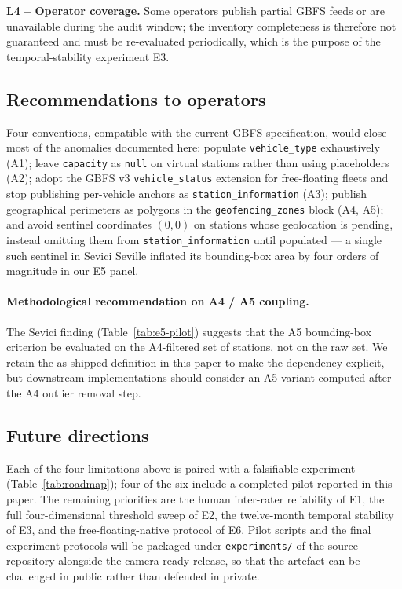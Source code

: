 \documentclass[11pt,a4paper]{article}
\begin{document}
\textbf{L4 -- Operator coverage.} Some operators publish partial GBFS
feeds or are unavailable during the audit window; the inventory
completeness is therefore not guaranteed and must be re-evaluated
periodically, which is the purpose of the temporal-stability
experiment E3.

\subsection{Recommendations to operators}
Four conventions, compatible with the current GBFS specification,
would close most of the anomalies documented here: populate
\texttt{vehicle\_type} exhaustively (A1); leave \texttt{capacity}
as \texttt{null} on virtual stations rather than using placeholders
(A2); adopt the GBFS v3 \texttt{vehicle\_status} extension for
free-floating fleets and stop publishing per-vehicle anchors as
\texttt{station\_information} (A3); publish geographical perimeters
as polygons in the \texttt{geofencing\_zones} block (A4, A5); and
avoid sentinel coordinates $(0,0)$ on stations whose geolocation is
pending, instead omitting them from \texttt{station\_information}
until populated --- a single such sentinel in Sevici Seville
inflated its bounding-box area by four orders of magnitude in our
E5 panel.

\paragraph{Methodological recommendation on A4 / A5 coupling.}
The Sevici finding (Table~\ref{tab:e5-pilot}) suggests that the A5
bounding-box criterion be evaluated on the A4-filtered set of
stations, not on the raw set. We retain the as-shipped definition
in this paper to make the dependency explicit, but downstream
implementations should consider an A5 variant computed after the
A4 outlier removal step.

\subsection{Future directions}
Each of the four limitations above is paired with a falsifiable
experiment (Table~\ref{tab:roadmap}); four of the six include a
completed pilot reported in this paper. The remaining priorities are
the human inter-rater reliability of E1, the full four-dimensional
threshold sweep of E2, the twelve-month temporal stability of E3,
and the free-floating-native protocol of E6. Pilot scripts and the
final experiment protocols will be packaged under
\texttt{experiments/} of the source repository alongside the
camera-ready release, so that the artefact can be challenged in
public rather than defended in private.
\end{document}
